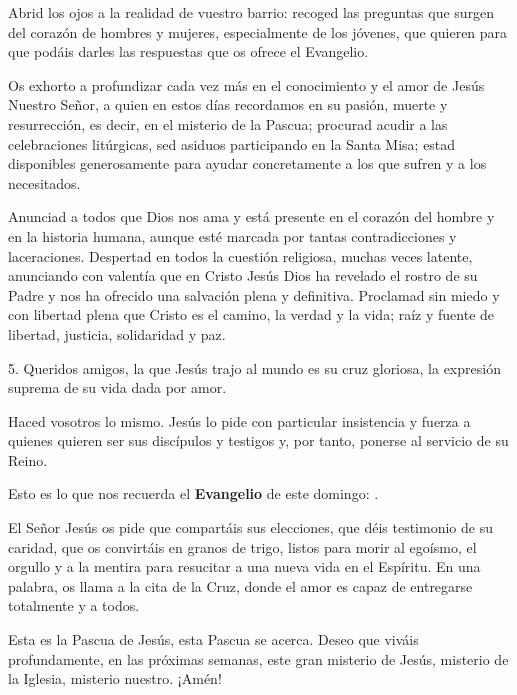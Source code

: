 \begin{body}
Abrid los ojos a la realidad de vuestro barrio: recoged las preguntas que surgen del corazón de hombres y mujeres, especialmente de los jóvenes, que quieren  para que podáis darles las respuestas que os ofrece el Evangelio.


\newpage 
Os exhorto a profundizar cada vez más en el conocimiento y el amor de Jesús Nuestro Señor, a quien en estos días recordamos en su pasión, muerte y resurrección, es decir, en el misterio de la Pascua; procurad acudir a las celebraciones litúrgicas, sed asiduos participando en la Santa Misa; estad disponibles generosamente para ayudar concretamente a los que sufren y a los necesitados.

Anunciad a todos que Dios nos ama y está presente en el corazón del hombre y en la historia humana, aunque esté marcada por tantas contradicciones y laceraciones. Despertad en todos la cuestión religiosa, muchas veces latente, anunciando con valentía que en Cristo Jesús Dios ha revelado el rostro de su Padre y nos ha ofrecido una salvación plena y definitiva. Proclamad sin miedo y con libertad plena que Cristo es el camino, la verdad y la vida; raíz y fuente de libertad, justicia, solidaridad y paz.

5. Queridos amigos, la  que Jesús trajo al mundo es su cruz gloriosa, la expresión suprema de su vida dada por amor.

Haced vosotros lo mismo. Jesús lo pide con particular insistencia y fuerza a quienes quieren ser sus discípulos y testigos y, por tanto, ponerse al servicio de su Reino.

Esto es lo que nos recuerda el \textbf{Evangelio} de este domingo: .

El Señor Jesús os pide que compartáis sus elecciones, que déis testimonio de su caridad, que os convirtáis en granos de trigo, listos para morir al egoísmo, el orgullo y a la mentira para resucitar a una nueva vida en el Espíritu. En una palabra, os llama a la cita de la Cruz, donde el amor es capaz de entregarse totalmente y a todos.

Esta es la Pascua de Jesús, esta Pascua se acerca. Deseo que viváis profundamente, en las próximas semanas, este gran misterio de Jesús, misterio de la Iglesia, misterio nuestro. ¡Amén!
\end{body}

